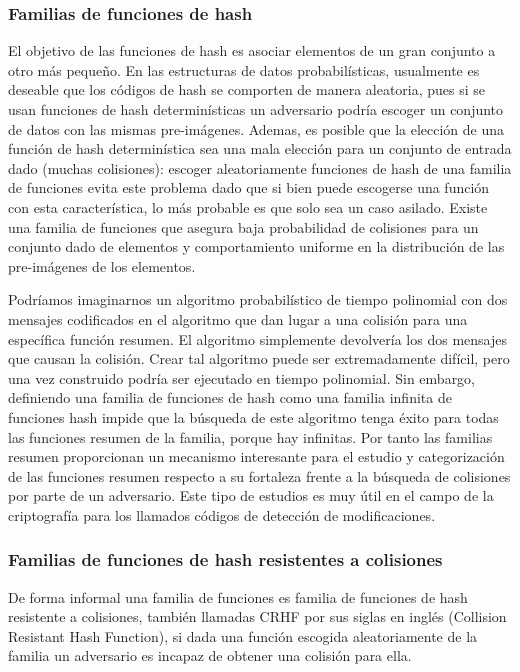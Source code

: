 \documentclass[a4paper,10pt, oneside]{article}
\begin{document}
\subsubsection{Familias de funciones de hash}
El objetivo de las funciones de hash es asociar elementos de un gran conjunto a otro más pequeño. En las estructuras de datos probabilísticas, usualmente es deseable que los códigos de hash se comporten de manera aleatoria, pues si se usan funciones de hash determinísticas un adversario podría escoger un conjunto de datos con las mismas pre-imágenes. Ademas, es posible que la elección de una función de hash determinística sea una mala elección para un conjunto de entrada dado (muchas colisiones): escoger aleatoriamente funciones de hash de una familia de funciones evita este problema dado que si bien puede escogerse una función con esta característica, lo más probable es que solo sea un caso asilado.
Existe una familia de funciones que asegura baja probabilidad de colisiones para un conjunto dado de elementos y comportamiento uniforme en la distribución de las pre-imágenes de los elementos\cite{WEGMAN1981265}.

Podríamos imaginarnos un algoritmo probabilístico de tiempo polinomial con dos mensajes codificados en el algoritmo que dan lugar a una colisión para una específica función resumen. El algoritmo simplemente devolvería los dos mensajes que causan la colisión. Crear tal algoritmo puede ser extremadamente difícil, pero una vez construido podría ser ejecutado en tiempo polinomial. Sin embargo, definiendo una familia de funciones de hash como una familia infinita de funciones hash impide que la búsqueda de este algoritmo tenga éxito para todas las funciones resumen de la familia, porque hay infinitas. Por tanto las familias resumen proporcionan un mecanismo interesante para el estudio y categorización de las funciones resumen respecto a su fortaleza frente a la búsqueda de colisiones por parte de un adversario. Este tipo de estudios es muy útil en el campo de la criptografía para los llamados códigos de detección de modificaciones.


\subsubsection{Familias de funciones de hash resistentes a colisiones}
De forma informal una familia de funciones es familia de funciones de hash resistente a colisiones, también llamadas CRHF por sus siglas en inglés (Collision Resistant Hash Function), si dada una función escogida aleatoriamente de la familia un adversario es incapaz de obtener una colisión para ella\cite{chunyuean}.
\end{document}
